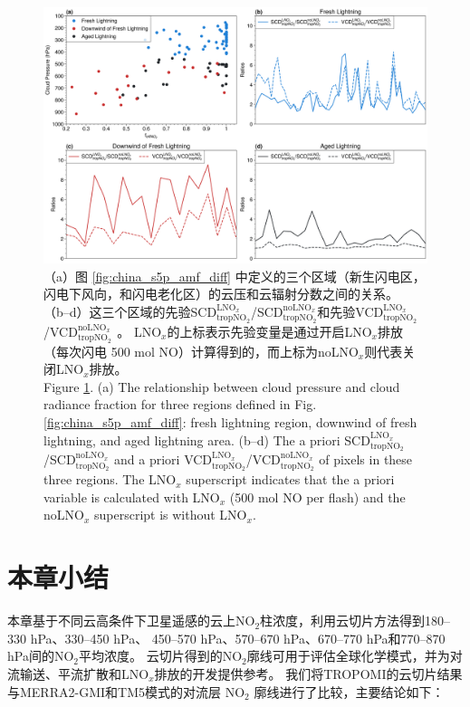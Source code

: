 \begin{figure}[H]
    \centering
    \includegraphics[width=14cm]{./figures/china_amf_contribution.png}
    \caption{
    （a）图 \ref{fig:china_s5p_amf_diff} 中定义的三个区域（新生闪电区，闪电下风向，和闪电老化区）的云压和云辐射分数之间的关系。
     （b--d）这三个区域的先验SCD$^{\textrm{LNO$_x$}}_{\textrm{tropNO$_2$}}$/SCD$^{\textrm{noLNO$_x$}}_{ \textrm{tropNO$_2$}}$和先验VCD$^{\textrm{LNO$_x$}}_{\textrm{tropNO$_2$}}$/VCD$^{\textrm{noLNO$_x$ }}_{\textrm{tropNO$_2$}}$。
     LNO$_x$的上标表示先验变量是通过开启LNO$_x$排放（每次闪电 500 mol NO）计算得到的，而上标为noLNO$_x$则代表关闭LNO$_x$排放。\\
     Figure \ref{fig:china_amf_contribution}. (a) The relationship between cloud pressure and cloud radiance fraction for three regions defined in Fig. \ref{fig:china_s5p_amf_diff}: fresh lightning region, downwind of fresh lightning, and aged lightning area.
    (b--d) The a priori SCD$^{\textrm{LNO$_x$}}_{\textrm{tropNO$_2$}}$/SCD$^{\textrm{noLNO$_x$}}_{\textrm{tropNO$_2$}}$ and a priori VCD$^{\textrm{LNO$_x$}}_{\textrm{tropNO$_2$}}$/VCD$^{\textrm{noLNO$_x$}}_{\textrm{tropNO$_2$}}$ of pixels in these three regions. The LNO$_x$ superscript indicates that the a priori variable is calculated with LNO$_x$ (500 mol NO per flash) and the noLNO$_x$ superscript is without LNO$_x$.
    }
    \label{fig:china_amf_contribution}
\end{figure}


\section{本章小结}

本章基于不同云高条件下卫星遥感的云上NO$_2$柱浓度，利用云切片方法得到180--330 hPa、330--450 hPa、
450--570 hPa、570--670 hPa、670--770 hPa和770--870 hPa间的NO$_2$平均浓度。
云切片得到的NO$_2$廓线可用于评估全球化学模式，并为对流输送、平流扩散和LNO$_x$排放的开发提供参考。
我们将TROPOMI的云切片结果与MERRA2-GMI和TM5模式的对流层 NO$_2$ 廓线进行了比较，主要结论如下：

